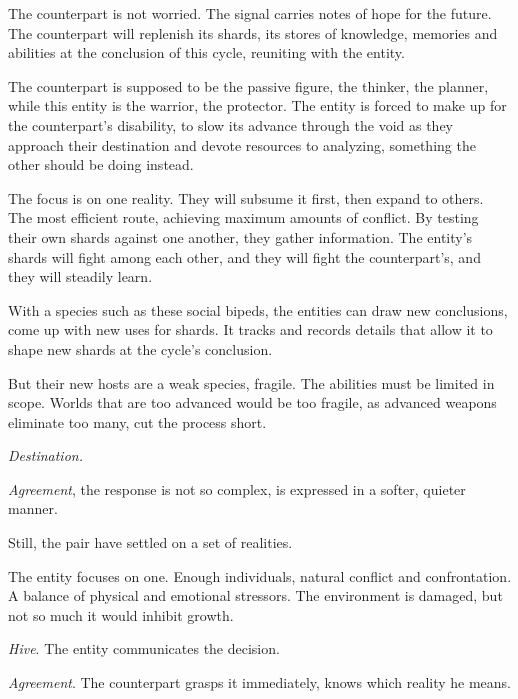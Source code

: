 The counterpart is not worried.  The signal carries notes of hope for the future.  The counterpart will replenish its shards, its stores of knowledge, memories and abilities at the conclusion of this cycle, reuniting with the entity.



The counterpart is supposed to be the passive figure, the thinker, the planner, while this entity is the warrior, the protector.  The entity is forced to make up for the counterpart's disability, to slow its advance through the void as they approach their destination and devote resources to analyzing, something the other should be doing instead.



The focus is on one reality.  They will subsume it first, then expand to others.  The most efficient route, achieving maximum amounts of conflict.  By testing their own shards against one another, they gather information.  The entity's shards will fight among each other, and they will fight the counterpart's, and they will steadily learn.



With a species such as these social bipeds, the entities can draw new conclusions, come up with new uses for shards.  It tracks and records details that allow it to shape new shards at the cycle's conclusion.



But their new hosts are a weak species, fragile.  The abilities must be limited in scope.  Worlds that are too advanced would be too fragile, as advanced weapons eliminate too many, cut the process short.



\emph{Destination.}



\emph{Agreement}, the response is not so complex, is expressed in a softer, quieter manner.



Still, the pair have settled on a set of realities.



The entity focuses on one.  Enough individuals, natural conflict and confrontation.  A balance of physical and emotional stressors.  The environment is damaged, but not so much it would inhibit growth.



\emph{Hive}.  The entity communicates the decision.



\emph{Agreement}.  The counterpart grasps it immediately, knows which reality he means.



